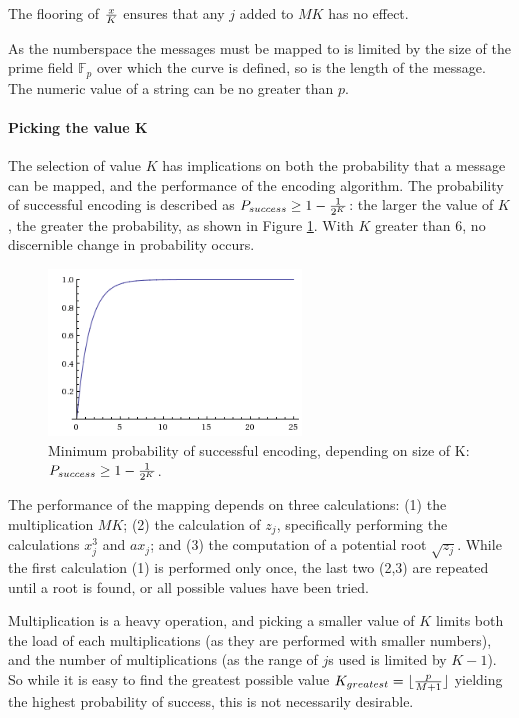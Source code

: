 The flooring of \(x \over K\) ensures that any \(j\) added to \(MK\) has no effect.\cite{MappingAMessage}

As the numberspace the messages must be mapped to is limited by the size of the prime field \(\mathbb{F}_p\) over which the curve is defined, so is the
length of the message. The numeric value of a string can be no greater than \(p\).

\paragraph{Picking the value K}

The selection of value \(K\) has implications on both the probability that a message can be mapped, and the performance of the encoding algorithm.
The probability of successful encoding is described as \(P_{success} \geq 1 - {1 \over {2^K}}\): the larger the value of \(K\), the greater the probability,
as shown in Figure \ref{fig:probability}. With \(K\) greater than 6, no discernible change in probability occurs.\cite{MappingAMessage}

\begin{figure}[htb]
	\centering
	\includegraphics[width=0.6\textwidth]{maths/encoding-probability}
	\caption{Minimum probability of successful encoding, depending on size of K: \(P_{success} \geq 1 - {1 \over {2^K}}\).}
	\label{fig:probability}
\end{figure}

The performance of the mapping depends on three calculations: (1) the multiplication \(MK\); (2) the calculation of \(z_j\), specifically
performing the calculations \(x_j^3\) and \(ax_j\); and (3) the computation of a potential root \(\sqrt{z_j}\). While the first calculation (1)
is performed only once, the last two (2,3) are repeated until a root is found, or all possible values have been tried.

Multiplication is a heavy operation, and picking a smaller value of \(K\) limits both the load of each multiplications (as they are performed with
smaller numbers), and the number of multiplications (as the range of \(j\)s used is limited by \(K - 1\)). So while it is easy to find the greatest
possible value \(K_{greatest} = {\lfloor { p \over {M + 1} }\rfloor}\) yielding the highest probability of success, this is not necessarily desirable.

